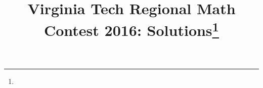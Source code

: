 \documentclass[10pt]{article}
\begin{document}
\title{Virginia Tech Regional Math Contest 2016: Solutions\footnote{\disclaimer}}
\author{\vspace{-2ex}}
\date{\vspace{-5ex}} %
\maketitle

%

%

%

%

%

%

%
\end{document}
